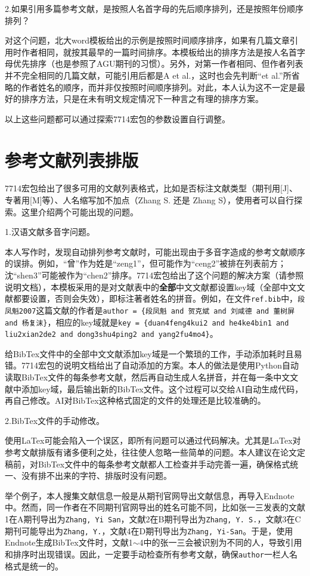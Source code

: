 2.如果引用多篇参考文献，是按照人名首字母的先后顺序排列，还是按照年份顺序排列？

对这个问题，北大word模板给出的示例是按照时间顺序排序，如果有几篇文章引用时作者相同，就按其最早的一篇时间排序。本模板给出的排序方法是按人名首字母优先排序（也是参照了AGU期刊的习惯）。另外，对第一作者相同、但作者列表并不完全相同的几篇文献，可能引用后都是A et al.，这时也会先判断“et al.”所省略的作者姓名的顺序，而并非仅按照时间顺序排列。对此，本人认为这不一定是最好的排序方法，只是在未有明文规定情况下一种言之有理的排序方案。

以上这些问题都可以通过探索7714宏包的参数设置自行调整。

\section{参考文献列表排版}

7714宏包给出了很多可用的文献列表格式，比如是否标注文献类型（期刊用[J]、专著用[M]等）、人名缩写加不加点（Zhang S. 还是 Zhang S），使用者可以自行探索。这里介绍两个可能出现的问题。

1.汉语文献多音字问题。

本人写作时，发现自动排列参考文献时，可能出现由于多音字造成的参考文献顺序的误排。例如，“曾”作为姓是“zeng1”，但可能作为“ceng2”被排在列表前方；沈“shen3”可能被作为“chen2”排序。7714宏包给出了这个问题的解决方案（请参照说明文档），本模板采用的是对文献表中的\textbf{全部}中文文献都设置key域（全部中文文献都要设置，否则会失效），即标注著者姓名的拼音。例如，在文件\texttt{ref.bib}中，\texttt{段凤魁2007}这篇文献的作者是\texttt{author = \{段凤魁 and 贺克斌 and 刘咸德 and 董树屏 and 杨复沫\}}，相应的key域就是\texttt{key = \{duan4feng4kui2 and he4ke4bin1 and liu2xian2de2 and dong3shu4ping2 and yang2fu4mo4\}}。

给BibTex文件中的全部中文文献添加key域是一个繁琐的工作，手动添加耗时且易错。7714宏包的说明文档给出了自动添加的方案。本人的做法是使用Python自动读取BibTex文件的每条参考文献，然后再自动生成人名拼音，并在每一条中文文献中添加key域，最后输出新的BibTex文件。这个过程可以交给AI自动生成代码，再自己修改。AI对BibTex这种格式固定的文件的处理还是比较准确的。

2.BibTex文件的手动修改。

使用LaTex可能会陷入一个误区，即所有问题可以通过代码解决。尤其是LaTex对参考文献排版有诸多便利之处，往往使人忽略一些简单的问题。本人建议在论文定稿前，对BibTex文件中的每条参考文献都人工检查并手动完善一遍，确保格式统一、没有排不出来的字符、排版时没有问题。

举个例子，本人搜集文献信息一般是从期刊官网导出文献信息，再导入Endnote中。然而，同一作者在不同期刊官网导出的姓名可能不同，比如张一三发表的文献1在A期刊导出为\texttt{Zhang, Yi San}，文献2在B期刊导出为\texttt{Zhang, Y. S.}，文献3在C期刊可能导出为\texttt{Zhang, Y.}，文献4在D期刊导出为\texttt{Zhang, Yi-San}。于是，使用Endnote生成BibTex文件时，文献1$\sim$4中的张一三会被识别为不同的人，导致引用和排序时出现错误。因此，一定要手动检查所有参考文献，确保\texttt{author}一栏人名格式是统一的。

